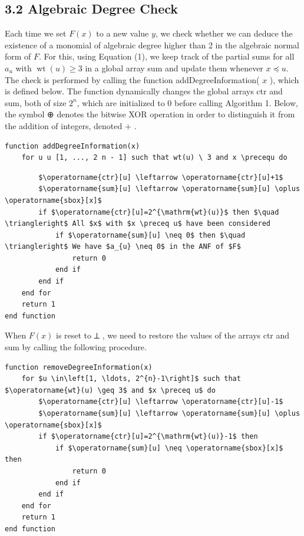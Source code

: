 \documentclass[10pt]{article}
\begin{document}
\subsection*{3.2 Algebraic Degree Check}
Each time we set $F(x)$ to a new value $y$, we check whether we can deduce the existence of a monomial of algebraic degree higher than 2 in the algebraic normal form of $F$. For this, using Equation (1), we keep track of the partial sums for all $a_{u}$ with $\operatorname{wt}(u) \geq 3$ in a global array sum and update them whenever $x \preceq u$. The check is performed by calling the function addDegreeInformation( $x$ ), which is defined below. The function dynamically changes the global arrays ctr and sum, both of size $2^{n}$, which are initialized to 0 before calling Algorithm 1. Below, the symbol ⊕ denotes the bitwise XOR operation in order to distinguish it from the addition of integers, denoted + .

\begin{verbatim}
function addDegreeInformation(x)
    for u u [1, ..., 2 n - 1] such that wt(u) \ 3 and x \precequ do
\end{verbatim}

\begin{verbatim}
        $\operatorname{ctr}[u] \leftarrow \operatorname{ctr}[u]+1$
        $\operatorname{sum}[u] \leftarrow \operatorname{sum}[u] \oplus \operatorname{sbox}[x]$
        if $\operatorname{ctr}[u]=2^{\mathrm{wt}(u)}$ then $\quad \triangleright$ All $x$ with $x \preceq u$ have been considered
            if $\operatorname{sum}[u] \neq 0$ then $\quad \triangleright$ We have $a_{u} \neq 0$ in the ANF of $F$
                return 0
            end if
        end if
    end for
    return 1
end function
\end{verbatim}

When $F(x)$ is reset to ⟂ , we need to restore the values of the arrays ctr and sum by calling the following procedure.

\begin{verbatim}
function removeDegreeInformation(x)
    for $u \in\left[1, \ldots, 2^{n}-1\right]$ such that $\operatorname{wt}(u) \geq 3$ and $x \preceq u$ do
        $\operatorname{ctr}[u] \leftarrow \operatorname{ctr}[u]-1$
        $\operatorname{sum}[u] \leftarrow \operatorname{sum}[u] \oplus \operatorname{sbox}[x]$
        if $\operatorname{ctr}[u]=2^{\mathrm{wt}(u)}-1$ then
            if $\operatorname{sum}[u] \neq \operatorname{sbox}[x]$ then
                return 0
            end if
        end if
    end for
    return 1
end function
\end{verbatim}
\end{document}
